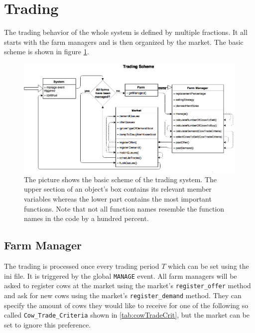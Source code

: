 \section{Trading}\label{chap:tradeDesc}
The trading behavior of the whole system is defined by multiple fractions. It all starts with the farm managers and is then organized by the market. The basic scheme is shown in figure \ref{fig:tradingScheme}.
\begin{figure}[htbp]
\centering
\noindent\includegraphics[width=\linewidth,height=\textheight,
keepaspectratio]{MarketFlow.png} 
\caption[Trading Scheme]{The picture shows the basic scheme of the trading system. The upper section of an object's box contains its relevant member variables whereas the lower part contains the most important functions. Note that not all function names resemble the function names in the code by a hundred percent.}
\label{fig:tradingScheme}
\end{figure}
\subsection{Farm Manager}
The trading is processed once every trading period $T$ which can be set using the ini file. It is triggered by the global {\tt MANAGE} event. All farm managers will be asked to register cows at the market using the market's {\tt register\_offer} method and ask for new cows using the market's {\tt register\_demand} method. They can specify the amount of cows they would like to receive for one of the following so called {\tt Cow\_Trade\_Criteria} shown in \ref{tab:cowTradeCrit}, but the market can be set to ignore this preference. 

